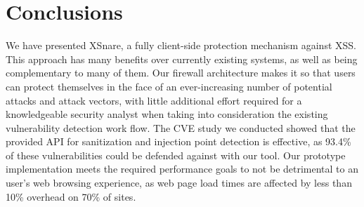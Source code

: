 \section{Conclusions}
We have presented XSnare, a fully client-side protection mechanism against XSS. This approach has many benefits over currently existing systems, as well as being complementary to many of them. Our firewall architecture makes it so that users can protect themselves in the face of an ever-increasing number of potential attacks and attack vectors, with little additional effort required for a knowledgeable security analyst when taking into consideration the existing vulnerability detection work flow. The CVE study we conducted showed that the provided API for sanitization and injection point detection is effective, as 93.4\% of these vulnerabilities could be defended against with our tool. Our prototype implementation meets the required performance goals to not be detrimental to an user's web browsing experience, as web page load times are affected by less than 10\% overhead on 70\% of sites. 
